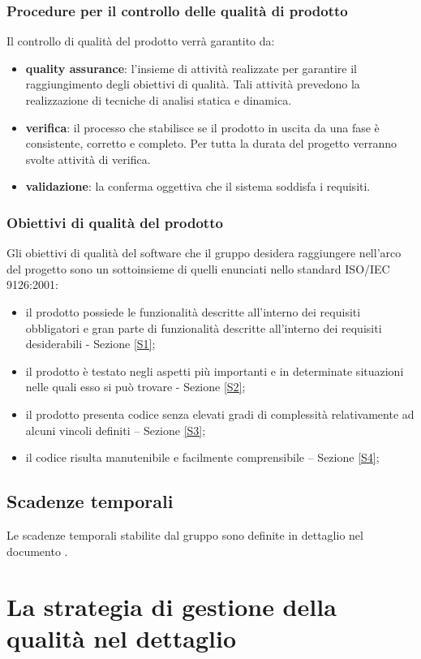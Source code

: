 		\subsubsection{Procedure per il controllo delle qualità di prodotto}
		Il controllo di qualità del prodotto verrà garantito da:
		\begin{itemize}
			\item \textbf{quality assurance}: l'insieme di attività realizzate per garantire il raggiungimento degli obiettivi di qualità. Tali attività prevedono la realizzazione di tecniche di analisi statica e dinamica.
			\item \textbf{verifica}: il processo che stabilisce se il prodotto in uscita da una fase è consistente, corretto e completo. Per tutta la durata del progetto verranno svolte attività di verifica.
			\item \textbf{validazione}: la conferma oggettiva che il sistema soddisfa i requisiti.
		\end{itemize}
		\subsubsection{Obiettivi di qualità del prodotto}
		Gli obiettivi di qualità del software che il gruppo \hx{} desidera raggiungere nell'arco del progetto sono un sottoinsieme di quelli enunciati nello standard ISO/IEC 9126:2001:
		\begin{itemize}
			\item il prodotto possiede le funzionalità descritte all'interno dei requisiti obbligatori e gran parte di funzionalità descritte all'interno dei requisiti desiderabili - Sezione \ref{S1};
			\item il prodotto è testato negli aspetti più importanti e in determinate situazioni nelle quali esso si può trovare - Sezione \ref{S2};
			\item il prodotto presenta codice senza elevati gradi di complessità relativamente ad alcuni vincoli definiti – Sezione \ref{S3};
			\item il codice risulta manutenibile e facilmente comprensibile – Sezione \ref{S4};
		\end{itemize}
	\subsection{Scadenze temporali}
	Le scadenze temporali stabilite dal gruppo sono definite in dettaglio nel documento \PdP.
\newpage
\section{La strategia di gestione della qualità nel dettaglio}
